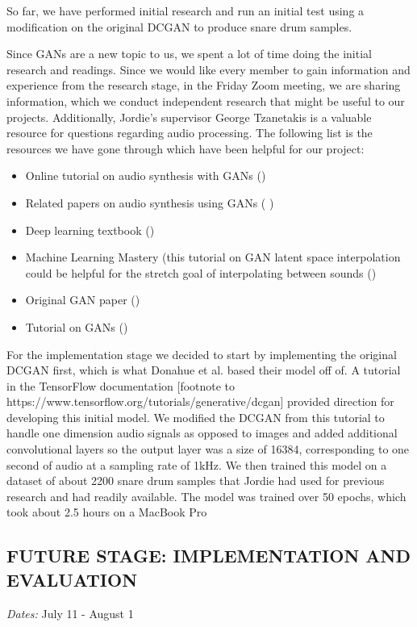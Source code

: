 \documentclass{article} %
\begin{document}
So far, we have performed initial research and run an initial test using a modification on the original DCGAN to produce snare drum samples.

Since GANs are a new topic to us, we spent a lot of time doing the initial research and readings. Since we would like every member to gain information and experience from the research stage, in the Friday Zoom meeting, we are sharing information, which we conduct independent research that might be useful to our projects. Additionally, Jordie’s supervisor George Tzanetakis is a valuable resource for questions regarding audio processing. The following list is the resources we have gone through which have been helpful for our project:
\begin{itemize}
  \item Online tutorial on audio synthesis with GANs (\citet{pasini2019syngan})
  \item Related papers on audio synthesis using GANs (\citet{donahue2018adversarial} \citet{engel2018gansynth} )
  \item  Deep learning textbook (\citet{lecun2015deep})
  \item Machine Learning Mastery (this tutorial on GAN latent space interpolation could be helpful for the stretch goal of interpolating between sounds (\citet{brownlee2019ganlatent})
  \item Original GAN paper (\citet{goodfellow2014generative})
  \item Tutorial on GANs (\citet{goodfellow2016nips})
\end{itemize}

For the implementation stage we decided to start by implementing the original DCGAN first, which is what Donahue et al. based their model off of. A tutorial in the TensorFlow documentation [footnote to https://www.tensorflow.org/tutorials/generative/dcgan] provided direction for developing this initial model. We modified the DCGAN from this tutorial to handle one dimension audio signals as opposed to images and added additional convolutional layers so the output layer was a size of 16384, corresponding to one second of audio at a sampling rate of 1kHz. We then trained this model on a dataset of about 2200 snare drum samples that Jordie had used for previous research and had readily available. The model was trained over 50 epochs, which took about 2.5 hours on a MacBook Pro

\subsection{FUTURE STAGE: IMPLEMENTATION AND EVALUATION}
 \emph{Dates:} July 11 - August 1
 
\end{document}
